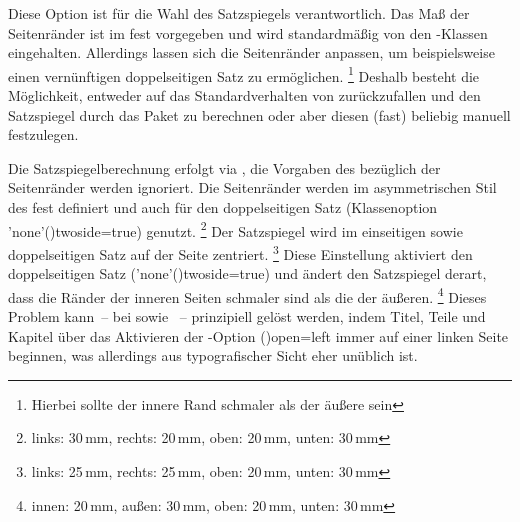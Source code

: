 \begin{DeclareEntity*}{}
\begin{DeclareEntity*}{}
\begin{DeclareEntity*}{}
\begin{Declaration}
Diese Option ist für die Wahl des Satzspiegels verantwortlich. Das Maß der 
Seitenränder ist im \CD fest vorgegeben und wird standardmäßig von den 
\TUDScript-Klassen eingehalten. Allerdings lassen sich die Seitenränder 
anpassen, um beispielsweise einen vernünftigen doppelseitigen Satz zu 
ermöglichen.%
\footnote{Hierbei sollte der innere Rand schmaler als der äußere sein}
Deshalb besteht die Möglichkeit, entweder auf das Standardverhalten von 
\KOMAScript zurückzufallen und den Satzspiegel durch das Paket 
 zu berechnen oder aber diesen (fast) beliebig manuell 
festzulegen.
%
\begin{DeclareValues}{}
  Die Satzspiegelberechnung erfolgt via , die Vorgaben des 
  \CDs bezüglich der Seitenränder werden ignoriert.
  Die Seitenränder werden im asymmetrischen Stil des \CDs fest definiert und 
  auch für den doppelseitigen Satz
  (Klassenoption \Option'none'(){twoside=true}) genutzt.%
  \footnote{links: 30\,mm, rechts: 20\,mm, oben: 20\,mm, unten: 30\,mm}
  Der Satzspiegel wird im einseitigen sowie doppelseitigen Satz auf der Seite 
  zentriert.%
  \footnote{links: 25\,mm, rechts: 25\,mm, oben: 20\,mm, unten: 30\,mm}
  Diese Einstellung aktiviert den doppelseitigen Satz 
  (\Option'none'(){twoside=true}) und ändert den Satzspiegel 
  derart, dass die Ränder der inneren Seiten schmaler sind als die der äußeren.%
  \footnote{innen: 20\,mm, außen: 30\,mm, oben: 20\,mm, unten: 30\,mm}
  Dieses Problem kann~-- bei  sowie ~-- 
  prinzipiell gelöst werden, indem Titel, Teile und Kapitel über das Aktivieren 
  der \KOMAScript-Option \Option(){open=left} immer 
  auf einer linken Seite beginnen, was allerdings aus typografischer Sicht eher 
  unüblich ist.
\end{DeclareValues}


\end{Declaration}
\end{DeclareEntity*}
\end{DeclareEntity*}
\end{DeclareEntity*}

